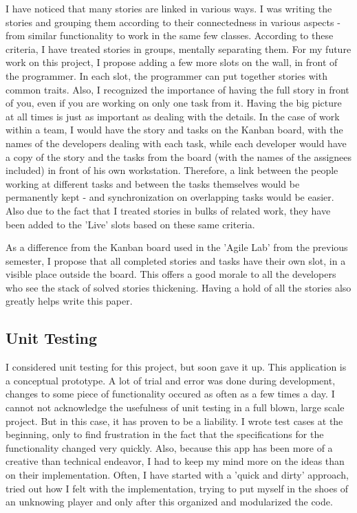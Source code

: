 \documentclass{article}
\begin{document}
I have noticed that many stories are linked in various ways. I was writing the
stories and grouping them according to their connectedness in various aspects -
from similar functionality to work in the same few classes. According to these
criteria, I have treated stories in groups, mentally separating them. For
my future work on this project, I propose adding a few more slots on the wall,
in front of the programmer. In each slot, the programmer can put together
stories with common traits. Also, I recognized the importance of having the full
story in front of you, even if you are working on only one task from it. Having
the big picture at all times is just as important as dealing with the details.
In the case of work within a team, I would have the story and tasks on the
Kanban board, with the names of the developers dealing with each task, while
each developer would have a copy of the story and the tasks from the board
(with the names of the assignees included) in front of his own workstation.
Therefore, a link between the people working at different tasks and between
the tasks themselves would be permanently kept - and synchronization on
overlapping tasks would be easier. Also due to the fact that I treated
stories in bulks of related work, they have been added to the 'Live'
slots based on these same criteria. \newline

As a difference from the Kanban board used in the 'Agile Lab' from the previous
semester, I propose that all completed stories and tasks have their own slot, in
a visible place outside the board. This offers a good morale to all the
developers who see the stack of solved stories thickening. Having a hold
of all the stories also greatly helps write this paper. \newline

\subsection{Unit Testing}

I considered unit testing for this project, but soon gave it up. This
application is a conceptual prototype. A lot of trial and error was done during
development, changes to some piece of functionality occured as often as a few
times a day. I cannot not acknowledge the usefulness of unit testing in a full
blown, large scale project. But in this case, it has proven to be a liability. I
wrote test cases at the beginning, only to find frustration in the fact that the
specifications for the functionality changed very quickly. Also, because this
app has been more of a creative than technical endeavor, I had to keep my mind
more on the ideas than on their implementation. Often, I have started with a
'quick and dirty' approach, tried out how I felt with the implementation, trying
to put myself in the shoes of an unknowing player and only after this organized
and modularized the code.
\end{document}
